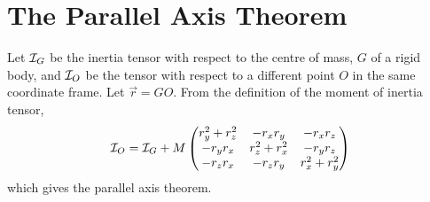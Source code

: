 \section{The Parallel Axis Theorem}
\label{sec:parall-axis-theor}

Let ${\cal I}_G$ be the inertia tensor with respect to the centre of
mass, $G$ of a rigid body, and ${\cal I}_O$ be the tensor with respect
to a different point $O$ in the same coordinate frame. Let $\vec{r} =
GO$.
From the definition of the moment of inertia tensor,
\[ {\cal I}_O = {\cal I}_G + M 
\begin{pmatrix}
  r_y^2 + r_z^2 & -r_x r_y & - r_x r_z \\
- r_y r_x & r_z^2 + r_x^2 & - r_y r_z \\
- r_z r_x & - r_z r_y & r_x^2 + r_y^2
\end{pmatrix}
\]
which gives the parallel axis theorem.

% 
